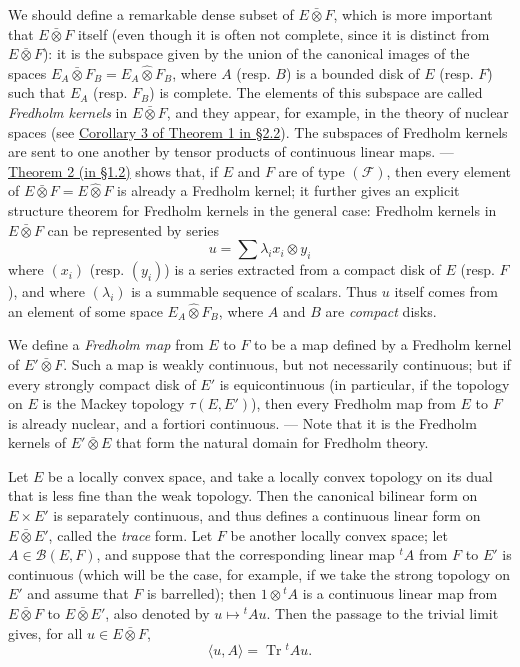 \documentclass[british]{article}
\newcommand{\oldpage}[1]{\marginpar{\footnotesize$\Big\vert$ \textit{p.~#1}}}
\begin{document}
We should define a remarkable dense subset of \(E\bar{\otimes}F\), which
is more important that \(E\bar{\otimes}F\) itself (even though it is
often not complete, since it is distinct from \(E\bar{\otimes}F\)): it
is the subspace given by the union of the canonical images of the spaces
\(E_A\bar{\otimes}F_B=E_A\hat{\otimes}F_B\), where \(A\) (resp. \(B\))
is a bounded disk of \(E\) (resp. \(F\)) such that \(E_A\) (resp.
\(F_B\)) is complete. The elements of this subspace are called
\emph{Fredholm kernels} in \(E\bar{\otimes}F\), and they appear, for
example, in the theory of nuclear spaces (see
\hyperref[section-2-corollary-3]{Corollary 3 of Theorem 1 in §2.2}). The
subspaces of Fredholm kernels are sent to one another by tensor products
of continuous linear maps. --- \hyperref[section-1-theorem-2]{Theorem 2
(in §1.2)} shows that, if \(E\) and \(F\) are of type \((\mathscr{F})\),
then every element of \(E\bar{\otimes}F=E\hat{\otimes}F\) is already a
Fredholm kernel; it further gives an explicit structure theorem for
Fredholm kernels in the general case: \oldpage{94} Fredholm kernels in
\(E\bar{\otimes}F\) can be represented by series \[
  u = \sum\lambda_i x_i\otimes y_i
\] where \((x_i)\) (resp. \((y_i)\)) is a series extracted from a
compact disk of \(E\) (resp. \(F\)), and where \((\lambda_i)\) is a
summable sequence of scalars. Thus \(u\) itself comes from an element of
some space \(E_A\hat{\otimes}F_B\), where \(A\) and \(B\) are
\emph{compact} disks.

We define a \emph{Fredholm map} from \(E\) to \(F\) to be a map defined
by a Fredholm kernel of \(E'\bar{\otimes}F\). Such a map is weakly
continuous, but not necessarily continuous; but if every strongly
compact disk of \(E'\) is equicontinuous (in particular, if the topology
on \(E\) is the Mackey topology \(\tau(E,E')\)), then every Fredholm map
from \(E\) to \(F\) is already nuclear, and a fortiori continuous. ---
Note that it is the Fredholm kernels of \(E'\bar{\otimes}E\) that form
the natural domain for Fredholm theory.

Let \(E\) be a locally convex space, and take a locally convex topology
on its dual that is less fine than the weak topology. Then the canonical
bilinear form on \(E\times E'\) is separately continuous, and thus
defines a continuous linear form on \(E\bar{\otimes}E'\), called the
\emph{trace} form. Let \(F\) be another locally convex space; let
\(A\in\mathscr{B}(E,F)\), and suppose that the corresponding linear map
\({}^tA\) from \(F\) to \(E'\) is continuous (which will be the case,
for example, if we take the strong topology on \(E'\) and assume that
\(F\) is barrelled); then \(1\otimes{}^tA\) is a continuous linear map
from \(E\bar{\otimes}F\) to \(E\bar{\otimes}E'\), also denoted by
\(u\mapsto {}^tAu\). Then the passage to the trivial limit gives, for
all \(u\in E\bar{\otimes}F\), \[
  \langle u,A\rangle = \operatorname{Tr}{}^tAu.
\]
\end{document}
